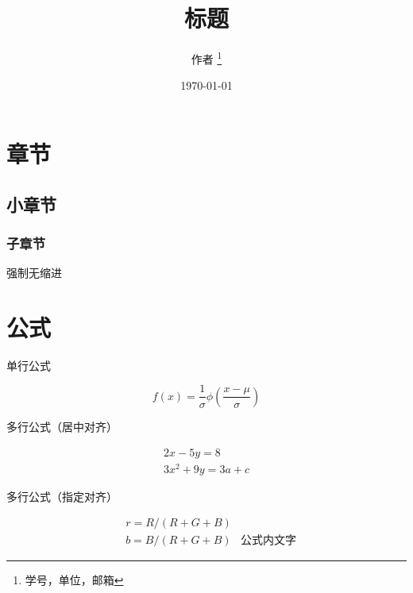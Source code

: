\documentclass[12pt,a4paper]{article}
\title{标题}
\author{

	作者 \thanks{学号，单位，邮箱} %

}
\date{\today}
\begin{document}
\maketitle



\section{章节}

\subsection{小章节}

\subsubsection{子章节}



\noindent 强制无缩进 





\section{公式}

单行公式

\begin{equation}

f(x) = \frac{1}{\sigma} \phi\left(\frac{x-\mu}{\sigma}\right)

\end{equation}



多行公式（居中对齐）

\begin{gather*} 

2x - 5y =  8 \\ 

3x^2 + 9y =  3a + c

\end{gather*}



多行公式（指定对齐）

\begin{align} %

& r = R/(R+G+B) & \nonumber \\

& b = B/(R+G+B) & \text{公式内文字} %

\end{align}
\end{document}
